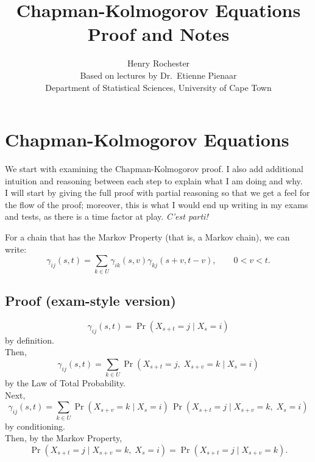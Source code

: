 \documentclass[12pt]{article}
\begin{document}
\title{Chapman-Kolmogorov Equations Proof and Notes}
\author{Henry Rochester\\
\small Based on lectures by Dr.\ Etienne Pienaar\\
\small Department of Statistical Sciences, University of Cape Town}
\date{}
\maketitle

\section*{Chapman-Kolmogorov Equations}

We start with examining the Chapman-Kolmogorov proof. I also add additional intuition and reasoning between each step to explain what I am doing and why.\\

I will start by giving the full proof with partial reasoning  so that we get a feel for the flow of the proof; moreover, this is what I would end up writing in my exams and tests, as there is a time factor at play. \textit{C'est parti!}\\

\vspace{0.5cm}

For a chain that has the Markov Property (that is, a Markov chain), we can write:\\
\[
\gamma_{ij}(s,t)
=
\sum_{k\in U}\gamma_{ik}(s,v)\gamma_{kj}(s+v,t-v),
\qquad 0<v<t.
\]

\subsection*{Proof (exam-style version)}

\[
\gamma_{ij}(s,t)=\Pr(X_{s+t}=j\mid X_s=i)
\]
by definition.\\

Then,
\[
\gamma_{ij}(s,t)
=
\sum_{k\in U}\Pr(X_{s+t}=j,\;X_{s+v}=k\mid X_s=i)
\]
by the Law of Total Probability.\\

Next,
\[
\gamma_{ij}(s,t)
=
\sum_{k\in U}
\Pr(X_{s+v}=k\mid X_s=i)\,
\Pr(X_{s+t}=j\mid X_{s+v}=k,\;X_s=i)
\]
by conditioning.\\

Then, by the Markov Property,
\[
\Pr(X_{s+t}=j\mid X_{s+v}=k,\;X_s=i)
=
\Pr(X_{s+t}=j\mid X_{s+v}=k).
\]\\
\end{document}
